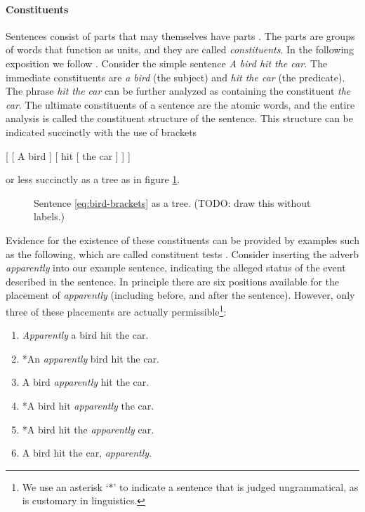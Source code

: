 \paragraph{Constituents} Sentences consist of parts that may themselves have parts \citep{huddleston2002grammar}. The parts are groups of words that function as units, and they are called \textit{constituents}. In the following exposition we follow \citet{huddleston2002grammar}. Consider the simple sentence \textit{A bird hit the car.} The immediate constituents are \textit{a bird} (the subject) and \textit{hit the car} (the predicate). The phrase \textit{hit the car} can be further analyzed as containing the constituent \textit{the car}. The ultimate constituents of a sentence are the atomic words, and the entire analysis is called the constituent structure of the sentence. This structure can be indicated succinctly with the use of brackets
\begin{center}
  [ [ A bird ] [ hit [ the car ] ] ]
  \label{eq:bird-brackets}
\end{center}
or less succinctly as a tree as in figure \ref{fig:bird-tree}.
\begin{figure}[h]{\textwidth}
  \center
  \caption{Sentence \ref{eq:bird-brackets} as a tree. (TODO: draw this without labels.)}
  \label{fig:bird-tree}
\end{figure}
Evidence for the existence of these constituents can be provided by examples such as the following, which are called constituent tests \citep{carnie2010constituent}. Consider inserting the adverb \textit{apparently} into our example sentence, indicating the alleged status of the event described in the sentence. In principle there are six positions available for the placement of \textit{apparently} (including before, and after the sentence). However, only three of these placements are actually permissible\footnote{We use an asterisk `*' to indicate a sentence that is judged ungrammatical, as is customary in linguistics.}:
\begin{enumerate}
  \item \textit{Apparently} a bird hit the car.
  \item *An \textit{apparently} bird hit the car.
  \item A bird \textit{apparently} hit the car.
  \item *A bird hit \textit{apparently} the car.
  \item *A bird hit the \textit{apparently} car.
  \item A bird hit the car, \textit{apparently}.
\end{enumerate}
